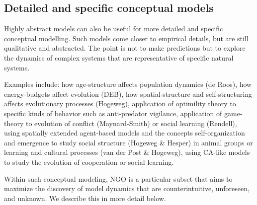 \subsection{Detailed and specific conceptual models}

Highly abstract models can also be useful for more detailed and specific conceptual modelling. Such models come closer to empirical details, but are still qualitative and abstracted. The point is not to make predictions but to explore the dynamics of complex systems that are representative of specific natural systems. 

Examples include: how age-structure affects population dynamics (de Roos), how energy-budgets affect evolution (DEB), how spatial-structure and self-structuring affects evolutionary processes (Hogeweg), application of optimility theory to specific kinds of behavior such as anti-predator vigilance, application of game-theory to evolution of conflict (Maynard-Smith) or social learning (Rendell), using spatially extended agent-based models and the concepts self-organization and emergence to study social structure (Hogeweg \& Hesper) in animal groups or learning and cultural processes (van der Post \& Hogeweg), using CA-like models to study the evolution of cooperation or social learning.

Within such conceptual modeling, NGO is a particular subset that aims to maximize the discovery of model dynamics that are counterintuitive, unforeseen, and unknown. We describe this in more detail below.
  